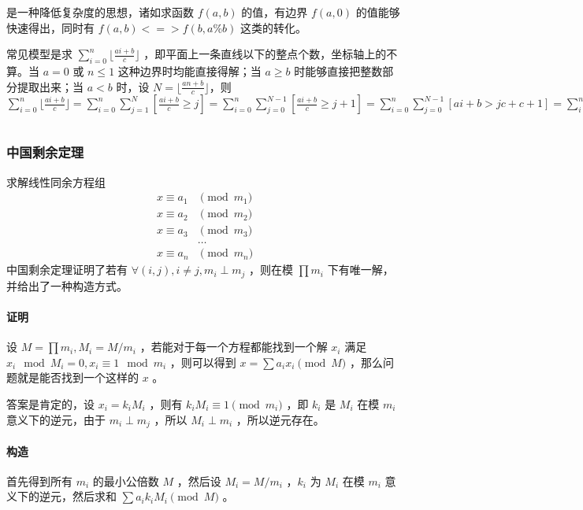 \documentclass[UTF-8]{ctexart}
\newcommand{\cpp}[1]{\inputminted[bgcolor=bg,breaklines,breakanywhere=true]{c++}{#1}}
\begin{document}
			是一种降低复杂度的思想，诸如求函数 $f(a,b)$ 的值，有边界 $f(a,0)$ 的值能够快速得出，同时有 $f(a,b) <=> f(b,a\%b)$ 这类的转化。
	
			常见模型是求 $\sum_{i=0}^{n}\lfloor \frac{ai+b}{c} \rfloor$ ，即平面上一条直线以下的整点个数，坐标轴上的不算。当 $a=0$ 或 $n \le 1$ 这种边界时均能直接得解；当 $a \ge b$ 时能够直接把整数部分提取出来；当 $a < b$ 时，设 $N=\lfloor \frac{an+b}{c} \rfloor $，则 $\sum_{i=0}^{n}\lfloor \frac{ai+b}{c} \rfloor=\sum_{i=0}^{n} \sum_{j=1}^N [\frac{ai+b}{c} \ge j]=\sum_{i=0}^n \sum_{j=0}^{N-1} [\frac{ai+b}{c} \ge j+1]=\sum_{i=0}^n \sum_{j=0}^{N-1} [ai+b>jc+c+1]=\sum_{i=0}^n \sum_{j=0}^{N-1} [i>\frac{jc+c+1-b}{a}]=\sum_{j=0}^{N-1} n-\lfloor \frac{jc+c+1-b}{a} \rfloor=n(N-1)-\sum_{i=0}^{N-1} \lfloor \frac{ic+(c+1-b)}{a} \rfloor $
			
			\cpp{code//Math//simgcd.cpp}
			\subsubsection{中国剩余定理}
			求解线性同余方程组
			\begin{align}
			x \equiv a _ 1 & \pmod {m _ 1} \nonumber \\ 
			x \equiv a _ 2 & \pmod {m _ 2} \nonumber \\
			x \equiv a _ 3 & \pmod {m _ 3} \nonumber \\
			&\dots\nonumber \\
			x \equiv a _ n & \pmod {m _ n} \nonumber
			\end{align}
			中国剩余定理证明了若有 $\forall (i,j) ,i \neq j,m _ i \perp m _ j$ ，则在模 $\prod m _ i$ 下有唯一解，并给出了一种构造方式。
			\paragraph{证明}设 $M=\prod m _ i,M _ i=M/m _ i$ ，若能对于每一个方程都能找到一个解 $x _ i$ 满足 $x _ i \mod M _ i=0,x _ i \equiv 1 \mod{m _ i }$ ，则可以得到 $x = \sum a _ i x _ i \pmod M$ ，那么问题就是能否找到一个这样的 $x$ 。  
	
			答案是肯定的，设 $x _ i=k _ i M _ i$ ，则有 $k _ i M _ i \equiv 1 \pmod {m_i}$ ，即 $k _ i$ 是 $M _ i$ 在模 $m _ i$ 意义下的逆元，由于 $m _ i \perp m _ j$ ，所以 $M _ i \perp m _ i$ ，所以逆元存在。
			\paragraph{构造}首先得到所有 $m _ i$ 的最小公倍数 $M$ ，然后设 $M _ i =M/m _ i$ ，$k _ i$ 为 $M _ i$ 在模 $m _ i$ 意义下的逆元，然后求和 $\sum a _ i k _ i M _ i \pmod M $ 。
	
\end{document}
